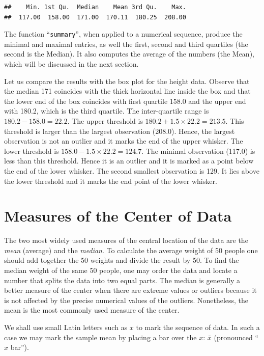 \documentclass[]{krantz}
\theoremstyle{definition}
\theoremstyle{definition}
\theoremstyle{definition}
\theoremstyle{remark}
\begin{document}
\begin{verbatim}
##    Min. 1st Qu.  Median    Mean 3rd Qu.    Max. 
##  117.00  158.00  171.00  170.11  180.25  208.00
\end{verbatim}

The function ``\texttt{summary}'', when applied to a numerical sequence, produce
the minimal and maximal entries, as well the first, second and third
quartiles (the second is the Median). It also computes the average of
the numbers (the Mean), which will be discussed in the next section.

Let us compare the results with the box plot for the height data.
Observe that the median 171 coincides
with the thick horizontal line inside the box and that the lower end of
the box coincides with first quartile 158.0 and the upper end with
180.2, which is the third quartile. The inter-quartile range is
\(180.2 - 158.0 = 22.2\). The upper threshold is
\(180.2 + 1.5 \times 22.2 = 213.5\). This threshold is larger than the
largest observation (208.0). Hence, the largest observation is not an
outlier and it marks the end of the upper whisker. The lower threshold
is \(158.0 - 1.5 \times 22.2 = 124.7\). The minimal observation (117.0) is
less than this threshold. Hence it is an outlier and it is marked as a
point below the end of the lower whisker. The second smallest
observation is 129. It lies above the lower threshold and it marks the
end point of the lower whisker.

\hypertarget{measures-of-the-center-of-data}{%
\section{Measures of the Center of Data}\label{measures-of-the-center-of-data}}

The two most widely used measures of the central location of the data
are the \emph{mean} (average) and the \emph{median}. To calculate the average
weight of 50 people one should add together the 50 weights and divide
the result by 50. To find the median weight of the same 50 people, one
may order the data and locate a number that splits the data into two
equal parts. The median is generally a better measure of the center when
there are extreme values or outliers because it is not affected by the
precise numerical values of the outliers. Nonetheless, the mean is the
most commonly used measure of the center.

We shall use small Latin letters such as \(x\) to mark the sequence of
data. In such a case we may mark the sample mean by placing a bar over
the \(x\): \(\bar x\) (pronounced ``\(x\) bar'').
\end{document}
